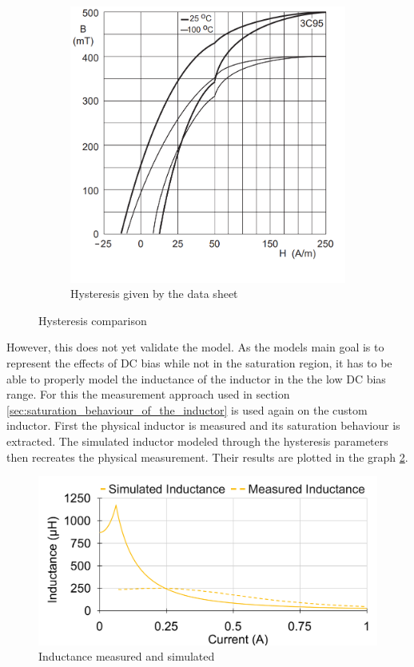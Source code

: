 \begin{figure}[H]
\begin{subfigure}[b]{0.49\textwidth}
        \includegraphics[width=\textwidth]{Bilder/Kapitel3/DataSheet_Hysteresis_Curve_2.png}
        \caption{Hysteresis given by the data sheet \cite{ferroxcubeProductSpecificationsCore2016}}
    \end{subfigure}
    \caption{Hysteresis comparison}
    \label{fig:hysteresis_comparison}							
\end{figure}
However, this does not yet validate the model. As the models main goal is to represent the effects of \ac{DC} bias while not in the saturation region, it has to be able to properly model the inductance of the inductor in the the low \ac{DC} bias range. For this the measurement approach used in section \ref{sec:saturation_behaviour_of_the_inductor} is used again on the custom inductor. First the physical inductor is measured and its saturation behaviour is extracted. The simulated inductor modeled through the hysteresis parameters then recreates the physical measurement. Their results are plotted in the graph \ref{fig:inductance_measured_and_simulatd}. 
\begin{figure}[H]
    \centering
    \includegraphics[width=.75\linewidth]{Bilder/Kapitel3/Saturation_Measured_and_Simulated_Hyst.pdf}
    \caption{Inductance measured and simulated}
    \label{fig:inductance_measured_and_simulatd}
\end{figure} 
